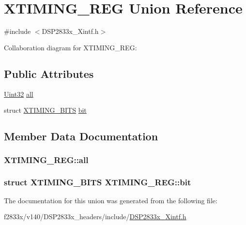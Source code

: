 \hypertarget{union_x_t_i_m_i_n_g___r_e_g}{}\section{X\+T\+I\+M\+I\+N\+G\+\_\+\+R\+E\+G Union Reference}
\label{union_x_t_i_m_i_n_g___r_e_g}


{\ttfamily \#include $<$D\+S\+P2833x\+\_\+\+Xintf.\+h$>$}



Collaboration diagram for X\+T\+I\+M\+I\+N\+G\+\_\+\+R\+E\+G\+:
\subsection*{Public Attributes}
\begin{DoxyCompactItemize}
\item 
\hyperlink{_d_s_p2833x___device_8h_aba99025e657f892beb7ff31cecf64653}{Uint32} \hyperlink{union_x_t_i_m_i_n_g___r_e_g_aed5e05822ee11207c6a5becf6530200d}{all}
\item 
struct \hyperlink{struct_x_t_i_m_i_n_g___b_i_t_s}{X\+T\+I\+M\+I\+N\+G\+\_\+\+B\+I\+T\+S} \hyperlink{union_x_t_i_m_i_n_g___r_e_g_af8a425cb35f29293162c12926138c929}{bit}
\end{DoxyCompactItemize}


\subsection{Member Data Documentation}
\hypertarget{union_x_t_i_m_i_n_g___r_e_g_aed5e05822ee11207c6a5becf6530200d}{}
\subsubsection[{all}]{ X\+T\+I\+M\+I\+N\+G\+\_\+\+R\+E\+G\+::all}\label{union_x_t_i_m_i_n_g___r_e_g_aed5e05822ee11207c6a5becf6530200d}
\hypertarget{union_x_t_i_m_i_n_g___r_e_g_af8a425cb35f29293162c12926138c929}{}
\subsubsection[{bit}]{\setlength{\rightskip}{0pt plus 5cm}struct {\bf X\+T\+I\+M\+I\+N\+G\+\_\+\+B\+I\+T\+S} X\+T\+I\+M\+I\+N\+G\+\_\+\+R\+E\+G\+::bit}\label{union_x_t_i_m_i_n_g___r_e_g_af8a425cb35f29293162c12926138c929}


The documentation for this union was generated from the following file\+:\begin{DoxyCompactItemize}
\item 
f2833x/v140/\+D\+S\+P2833x\+\_\+headers/include/\hyperlink{_d_s_p2833x___xintf_8h}{D\+S\+P2833x\+\_\+\+Xintf.\+h}\end{DoxyCompactItemize}
